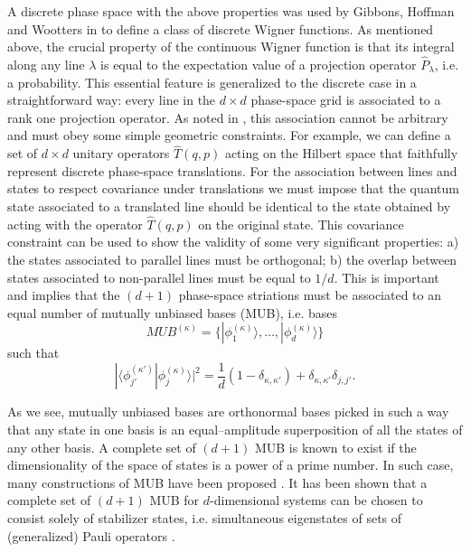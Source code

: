 \documentclass[aps,twocolumn,showpacs,nofootinbib,superscriptaddress]{revtex4}
\begin{document}
A discrete phase space with the above properties was used by
Gibbons, Hoffman and Wootters in \cite{GibbonsHW04} to define a
class of discrete Wigner functions. As mentioned above, the
crucial property of the continuous Wigner function is that its
integral along any line $\lambda$ is equal to the expectation
value of a projection operator $\hat{P}_\lambda$, i.e. a
probability. This essential feature is generalized to the discrete
case in a straightforward way: every line in the $d\times d$
phase-space grid is associated to a rank one projection operator.
As noted in \cite{GibbonsHW04}, this association cannot be
arbitrary and must obey some simple geometric constraints. For
example, we can define a set of $d\times d$ unitary operators
$\hat{T}(q,p)$ acting on the Hilbert space that faithfully
represent discrete phase-space translations. For the association
between lines and states to respect covariance under translations
we must impose that the quantum state associated to a translated
line should be identical to the state obtained by acting with the
operator $\hat{T}(q,p)$ on the original state. This covariance
constraint can be used to show the validity of some very
significant properties: a) the states associated to parallel lines
must be orthogonal; b) the overlap between states associated to
non-parallel lines must be equal to $1/d$. This is important and
implies that the $(d+1)$ phase-space striations must be associated
to an equal number of mutually unbiased bases (MUB), i.e. bases
\begin{equation}
MUB^{(\kappa)}=\{|\phi^{(\kappa)}_1\rangle,\ldots, |\phi^{(\kappa)}_d\rangle\}
\label{MUB}
\end{equation}
such that
\begin{equation}
|\langle
\phi^{(\kappa')}_{j'}|\phi^{(\kappa)}_j\rangle|^2=\frac{1}{d}
(1-\delta_{\kappa,\kappa'})+\delta_{\kappa,\kappa'} \delta_{j,j'}.
\label{eqmubcond}
\end{equation}

As we see, mutually unbiased bases are orthonormal bases picked in such a way
that any state in one basis is an equal--amplitude superposition of all the
states of any other basis. A complete set of $(d+1)$ MUB is known to exist
if the dimensionality of the space of states is a power of a prime number.
In such case, many constructions of MUB have been proposed \cite{Ivanovic81,
WoottersF89, LawrenceBZ02, BandyopadhyayBRV02, PittengerR04}. It has been shown
that a complete set of $(d+1)$ MUB for $d$-dimensional systems can be chosen
to consist solely of stabilizer states, i.e. simultaneous eigenstates of sets
of (generalized) Pauli operators \cite{LawrenceBZ02,BandyopadhyayBRV02,PittengerR04}.
\end{document}
